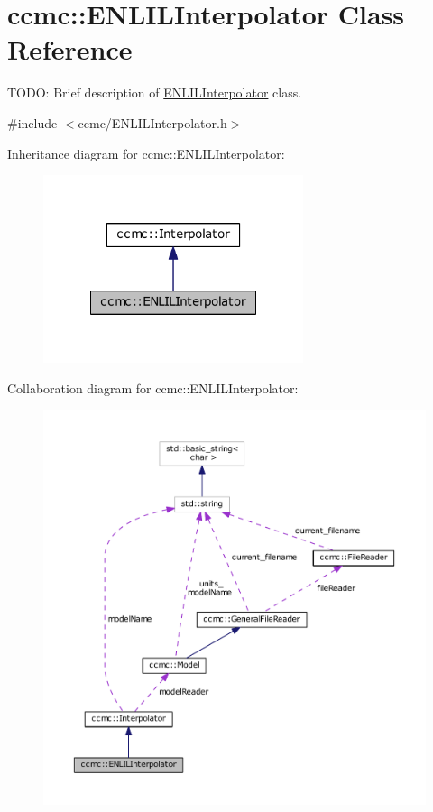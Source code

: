 \hypertarget{classccmc_1_1_e_n_l_i_l_interpolator}{\section{ccmc\-:\-:E\-N\-L\-I\-L\-Interpolator Class Reference}
\label{classccmc_1_1_e_n_l_i_l_interpolator}
}


T\-O\-D\-O\-: Brief description of \hyperlink{classccmc_1_1_e_n_l_i_l_interpolator}{E\-N\-L\-I\-L\-Interpolator} class.  




{\ttfamily \#include $<$ccmc/\-E\-N\-L\-I\-L\-Interpolator.\-h$>$}



Inheritance diagram for ccmc\-:\-:E\-N\-L\-I\-L\-Interpolator\-:
\nopagebreak
\begin{figure}[H]
\begin{center}
\leavevmode
\includegraphics[width=216pt]{classccmc_1_1_e_n_l_i_l_interpolator__inherit__graph}
\end{center}
\end{figure}


Collaboration diagram for ccmc\-:\-:E\-N\-L\-I\-L\-Interpolator\-:
\nopagebreak
\begin{figure}[H]
\begin{center}
\leavevmode
\includegraphics[width=350pt]{classccmc_1_1_e_n_l_i_l_interpolator__coll__graph}
\end{center}
\end{figure}
